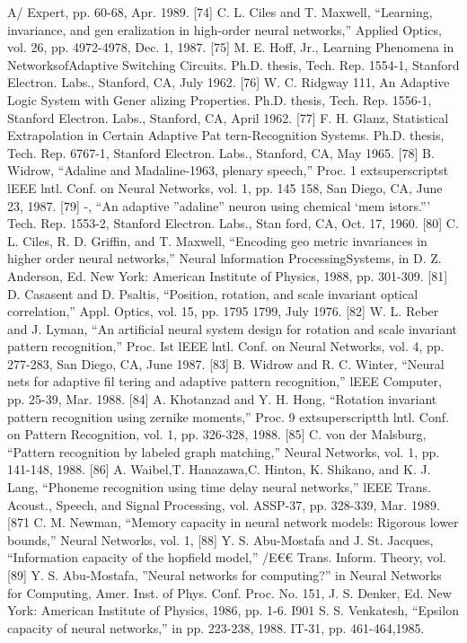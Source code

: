 \documentclass[11pt,a4paper,twocolumn]{article}
\begin{document}
{{A/ Expert, pp. 60-68, Apr. 1989. 
[74] C. L. Ciles and T. Maxwell, “Learning, invariance, and gen
eralization in high-order neural networks,” Applied Optics, 
vol. 26, pp. 4972-4978, Dec. 1, 1987. 
[75] M. E. Hoff, Jr., Learning Phenomena in NetworksofAdaptive 
Switching Circuits. Ph.D. thesis, Tech. Rep. 1554-1, Stanford 
Electron. Labs., Stanford, CA, July 1962. 
[76] W. C. Ridgway 111, An Adaptive Logic System with Gener
alizing Properties. Ph.D. thesis, Tech. Rep. 1556-1, Stanford 
Electron. Labs., Stanford, CA, April 1962. 
[77] F. H. Glanz, Statistical Extrapolation in Certain Adaptive Pat
tern-Recognition Systems. Ph.D. thesis, Tech. Rep. 
6767-1, Stanford Electron. Labs., Stanford, CA, May 1965. 
[78] B. Widrow, “Adaline and Madaline-1963, plenary speech,” 
Proc. 1	extsuperscript{st} lEEE lntl. Conf. on Neural Networks, vol. 1, pp. 145
158, San Diego, CA, June 23, 1987. 
[79] -, 
“An adaptive ”adaline” neuron using chemical ‘mem
istors.”’ Tech. Rep. 1553-2, Stanford Electron. Labs., Stan
ford, CA, Oct. 17, 1960. 
[80] C. L. Ciles, R. D. Griffin, and T. Maxwell, “Encoding geo
metric invariances in higher order neural networks,” Neural 
lnformation ProcessingSystems, in D. Z. Anderson, Ed. New 
York: American Institute of Physics, 1988, pp. 301-309. 
[81] D. Casasent and D. Psaltis, “Position, rotation, and scale 
invariant optical correlation,” Appl. Optics, vol. 15, pp. 1795
1799, July 1976. 
[82] W. L. Reber and J. Lyman, “An artificial neural system design 
for rotation and scale invariant pattern recognition,” Proc. 
Ist lEEE lntl. Conf. on Neural Networks, vol. 4, pp. 277-283, 
San Diego, CA, June 1987. 
[83] B. Widrow and R. C. Winter, “Neural nets for adaptive fil
tering and adaptive pattern recognition,” lEEE Computer, 
pp. 25-39, Mar. 1988. 
[84] A. Khotanzad and Y. H. Hong, “Rotation invariant pattern 
recognition using zernike moments,” Proc. 9	extsuperscript{th} lntl. Conf. 
on Pattern Recognition, vol. 1, pp. 326-328, 1988. 
[85] C. von der Malsburg, “Pattern recognition by labeled graph 
matching,” Neural Networks, vol. 1, pp. 141-148, 1988. 
[86] A. Waibel,T. Hanazawa,C. Hinton, K. Shikano, and K. J. Lang, 
“Phoneme recognition using time delay neural networks,” 
lEEE Trans. Acoust., Speech, and Signal Processing, vol. 
ASSP-37, pp. 328-339, Mar. 1989. 
[871 C. M. Newman, “Memory capacity in neural network 
models: Rigorous lower bounds,” Neural Networks, vol. 1, 
[88] Y. S. Abu-Mostafa and J. St. Jacques, “Information capacity 
of the hopfield model,” /E€€ Trans. Inform. Theory, vol. 
[89] Y. S. Abu-Mostafa, ”Neural networks for computing?” in 
Neural Networks for Computing, Amer. Inst. of Phys. Conf. 
Proc. No. 151, J. S. Denker, Ed. New York: American Institute 
of Physics, 1986, pp. 1-6. 
I901 S. S. Venkatesh, “Epsilon capacity of neural networks,” in 
pp. 223-238, 1988. 
IT-31, pp. 461-464,1985. 




}}
\end{document}
